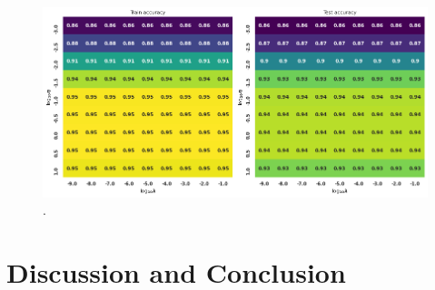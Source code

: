 \documentclass[]{article}
\begin{document}
\begin{figure}[!htb]
	\centering
	\includegraphics[width=1\linewidth]{log_digits.png}
	\caption{.}
	\label{fig:log_digits}
\end{figure}


\clearpage
\section{Discussion and Conclusion} \label{conclusion}




\clearpage


\end{document}
